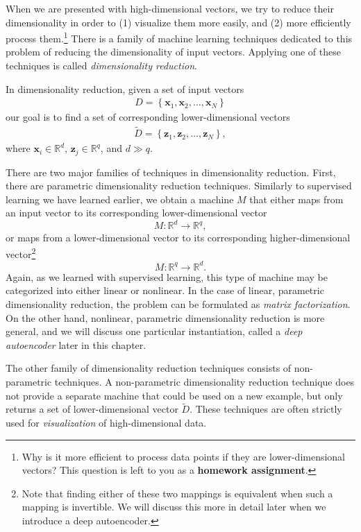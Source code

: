 \documentclass{report}
\newcommand{\vect}[1]{\mathbf{#1}}
\newcommand{\vx}[0]{\vect{x}}
\newcommand{\vz}[0]{\vect{z}}
\newcommand{\RR}[0]{\mathbb{R}}
\begin{document}
When we are presented with high-dimensional vectors, we try to reduce their
dimensionality in order to (1) visualize them more easily, and (2) more
efficiently process them.\footnote{
    Why is it more efficient to process data points if they are
    lower-dimensional vectors? This question is left to you as a {\bf homework
    assignment}.
} There is a family of machine learning techniques dedicated to this problem of
reducing the dimensionality of input vectors. Applying one of these techniques
is called {\it dimensionality reduction}.

In dimensionality reduction, given a set of input vectors 
\begin{align*}
    D=\left\{
    \vx_1, \vx_2, \ldots, \vx_N
\right\}
\end{align*}
our goal is to find a set of corresponding lower-dimensional vectors
\begin{align*}
    \tilde{D} = \left\{
        \vz_1, \vz_2, \ldots, \vz_N
    \right\},
\end{align*}
where $\vx_i \in \RR^d$, $\vz_j \in \RR^q$, and $d \gg q$. 

There are two major families of techniques in dimensionality reduction. First,
there are parametric dimensionality reduction techniques. Similarly to
supervised learning we have learned earlier, we obtain a machine $M$ that either
maps from an input vector to its corresponding lower-dimensional vector 
\[
    M: \RR^d \to \RR^q,
\]
or maps
from a lower-dimensional vector to its corresponding higher-dimensional
vector\footnote{
    Note that finding either of these two mappings is equivalent when such a
    mapping is invertible. We will discuss this more in detail later when we
    introduce a deep autoencoder. 
}
\[
    M: \RR^q \to \RR^d.
\]
Again, as we learned with supervised learning, this type of machine may be
categorized into either linear or nonlinear. In the case of linear, parametric
dimensionality reduction, the problem can be formulated as {\it matrix
factorization}. On the other hand, nonlinear, parametric dimensionality
reduction is more general, and we will discuss one particular instantiation,
called a {\it deep autoencoder} later in this chapter.

The other family of dimensionality reduction techniques consists of
non-parametric techniques. A non-parametric dimensionality reduction technique
does not provide a separate machine that could be used on a new example, but
only returns a set of lower-dimensional vector $\tilde{D}$. These techniques are
often strictly used for {\it visualization} of high-dimensional data. 
\end{document}
